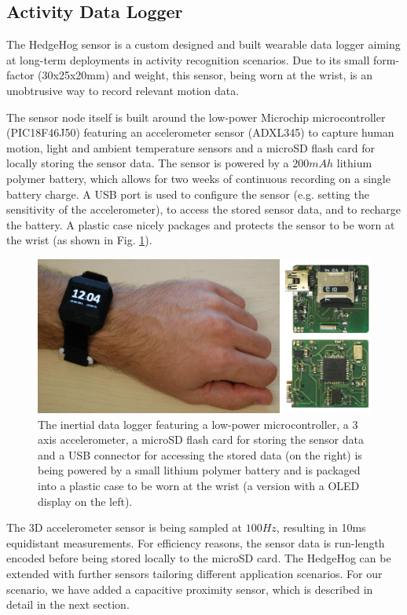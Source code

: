 \documentclass[runningheads,a4paper]{llncs}
\begin{document}
\subsection{Activity Data Logger}
The HedgeHog sensor is a custom designed and built wearable data logger aiming at long-term deployments in activity recognition scenarios. Due to its small form-factor (30x25x20mm) and weight, this sensor, being worn at the wrist, is an unobtrusive way to record relevant motion data.

The sensor node itself is built around the low-power Microchip microcontroller (PIC18F46J50) featuring an accelerometer sensor (ADXL345) to capture human motion, light and ambient temperature sensors and a microSD flash card for locally storing the sensor data. The sensor is powered by a $200mAh$ lithium polymer battery, which allows for two weeks of continuous recording on a single battery charge. A USB port is used to configure the sensor (e.g. setting the sensitivity of the accelerometer), to access the stored sensor data, and to recharge the battery. A plastic case nicely packages and protects the sensor to be worn at the wrist (as shown in Fig. \ref{fig:sensornode}).

\begin{figure}
	\centering
	\includegraphics[width=\textwidth]{Images/hardware_sensor_2.jpg}
	\caption{The inertial data logger featuring a low-power microcontroller, a 3 axis accelerometer, a microSD flash card for storing the sensor data and a USB connector for accessing the stored data (on the right) is being powered by a small lithium polymer battery and is packaged into a plastic case to be worn at the wrist (a version with a OLED display on the left).}
	\label{fig:sensornode}
\end{figure}

The 3D accelerometer sensor is being sampled at $100Hz$, resulting in 10ms equidistant measurements. For efficiency reasons, the sensor data is run-length encoded before being stored locally to the microSD card. The HedgeHog can be extended with further sensors tailoring different application scenarios. For our scenario, we have added a capacitive proximity sensor, which is described in detail in the next section.
\end{document}
